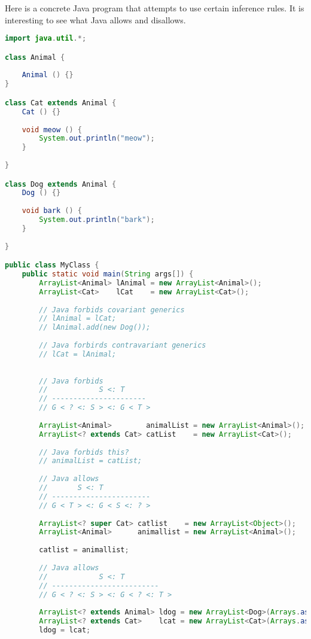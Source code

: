 \documentclass{article}
\begin{document}
\begin{example}
  Here is a concrete Java program that attempts to use certain inference rules.
  It is interesting to see what Java allows and disallows.
\begin{lstlisting}[escapechar=|, language=Java]
import java.util.*;

class Animal {
    
    Animal () {}
}

class Cat extends Animal {
    Cat () {}
    
    void meow () {
        System.out.println("meow");
    }
    
}

class Dog extends Animal {
    Dog () {}
    
    void bark () {
        System.out.println("bark");
    }
    
}

public class MyClass {
    public static void main(String args[]) {
        ArrayList<Animal> lAnimal = new ArrayList<Animal>();
        ArrayList<Cat>    lCat    = new ArrayList<Cat>();
        
        // Java forbids covariant generics
        // lAnimal = lCat;
        // lAnimal.add(new Dog());
        
        // Java forbirds contravariant generics
        // lCat = lAnimal;
        
        
        // Java forbids
        //            S <: T
        // ----------------------
        // G < ? <: S > <: G < T >
        
        ArrayList<Animal>        animalList = new ArrayList<Animal>();
        ArrayList<? extends Cat> catList    = new ArrayList<Cat>();
        
        // Java forbids this?
        // animalList = catList;
        
        // Java allows
        //       S <: T
        // -----------------------
        // G < T > <: G < S <: ? >
        
        ArrayList<? super Cat> catlist    = new ArrayList<Object>();
        ArrayList<Animal>      animallist = new ArrayList<Animal>();
        
        catlist = animallist;
        
        // Java allows
        //            S <: T
        // -------------------------
        // G < ? <: S > <: G < ? <: T >
        
        ArrayList<? extends Animal> ldog = new ArrayList<Dog>(Arrays.asList(new Dog()));
        ArrayList<? extends Cat>    lcat = new ArrayList<Cat>(Arrays.asList(new Cat()));
        ldog = lcat;
        

\end{lstlisting}
\end{example}
\end{document}
